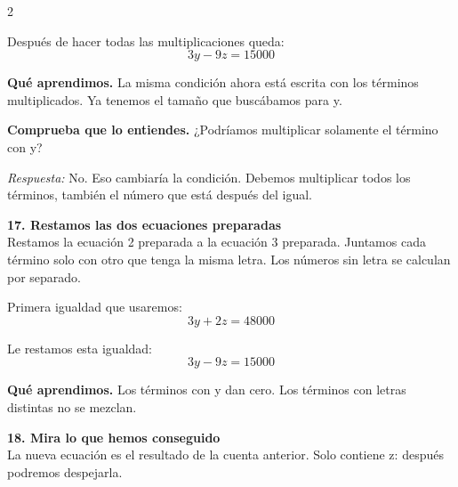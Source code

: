 \documentclass[11pt,a4paper,landscape]{article}
\begin{document}
\begin{multicols*}{2}
\begin{minipage}{\linewidth}
\par\smallskip Después de hacer todas las multiplicaciones queda:
\[3y - 9z = 15000\]
\par\smallskip\textbf{Qué aprendimos.} La misma condición ahora está escrita con los términos multiplicados. Ya tenemos el tamaño que buscábamos para y.
\par\smallskip\textbf{Comprueba que lo entiendes.} ¿Podríamos multiplicar solamente el término con y?\par\textit{Respuesta:} No. Eso cambiaría la condición. Debemos multiplicar todos los términos, también el número que está después del igual.
\end{minipage}\par\medskip
\noindent\begin{minipage}{\linewidth}\textbf{17. Restamos las dos ecuaciones preparadas}\\[2pt]Restamos la ecuación 2 preparada a la ecuación 3 preparada. Juntamos cada término solo con otro que tenga la misma letra. Los números sin letra se calculan por separado.
\par{}\par\smallskip
\par\smallskip Primera igualdad que usaremos:
\[3y + 2z = 48000\]
\par\smallskip Le restamos esta igualdad:
\[3y - 9z = 15000\]
\par\smallskip\textbf{Qué aprendimos.} Los términos con y dan cero. Los términos con letras distintas no se mezclan.
\end{minipage}\par\medskip
\noindent\begin{minipage}{\linewidth}\textbf{18. Mira lo que hemos conseguido}\\[2pt]La nueva ecuación es el resultado de la cuenta anterior. Solo contiene z: después podremos despejarla.

\end{minipage}
\end{multicols*}
\end{document}

